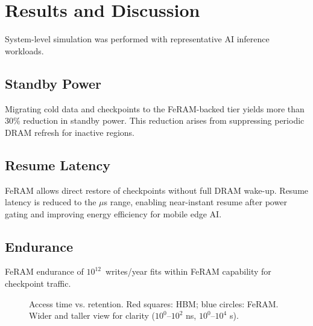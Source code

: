 \section{Results and Discussion}
System-level simulation was performed with representative AI inference workloads.

\subsection{Standby Power}
Migrating cold data and checkpoints to the FeRAM-backed tier yields more than 30\% reduction in standby power.
This reduction arises from suppressing periodic DRAM refresh for inactive regions.

\subsection{Resume Latency}
FeRAM allows direct restore of checkpoints without full DRAM wake-up.
Resume latency is reduced to the $\mu$s range, enabling near-instant resume after power gating and improving energy efficiency for mobile edge AI.

\subsection{Endurance}
FeRAM endurance of $10^{12}$~writes/year fits within FeRAM capability for checkpoint traffic.

\begin{figure}[!t]
\centering
{}
\caption{Access time vs. retention. Red squares: HBM; blue circles: FeRAM. Wider and taller view for clarity ($10^0$--$10^2$ ns, $10^0$--$10^4$ s).}
\label{fig:retention}
\end{figure}
